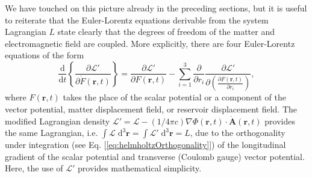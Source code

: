 \documentclass{article}
\begin{document}
We have touched on this picture already in the preceding sections, but it is useful to reiterate that the Euler-Lorentz equations derivable from the system Lagrangian $L$ state clearly that the degrees of freedom of the matter and electromagnetic field are coupled. More explicitly, there are four Euler-Lorentz equations of the form
\begin{equation}
\frac{\mathrm{d}}{\mathrm{d}t}\left\{\frac{\partial\mathcal{L}'}{\partial\dot{F}(\mathbf{r},t)}\right\} = \frac{\partial\mathcal{L}'}{\partial F(\mathbf{r},t)} - \sum_{i = 1}^3\frac{\partial}{\partial r_i}\frac{\partial\mathcal{L}'}{\partial\left(\frac{\partial F(\mathbf{r},t)}{\partial r_i}\right)},
\end{equation}
where $F(\mathbf{r},t)$ takes the place of the scalar potential or a component of the vector potential, matter displacement field, or reservoir displacement field. The modified Lagrangian density $\mathcal{L}' = \mathcal{L} - (1/4\pi c)\nabla\Phi(\mathbf{r},t)\cdot\dot{\mathbf{A}}(\mathbf{r},t)$ provides the same Lagrangian, i.e. $\int\mathcal{L}\;\mathrm{d}^3\mathbf{r} = \int\mathcal{L}'\;\mathrm{d}^3\mathbf{r} = L$, due to the orthogonality under integration (see Eq. [\ref{eq:helmholtzOrthogonality}]) of the longitudinal gradient of the scalar potential and transverse (Coulomb gauge) vector potential. Here, the use of $\mathcal{L}'$ provides mathematical simplicity.
\end{document}
